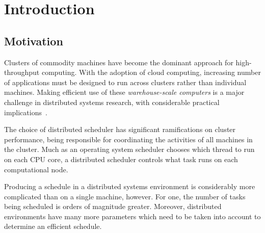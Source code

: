 \chapter{Introduction} \label{chap:intro}

\section{Motivation} \label{sec:intro-motivation}
Clusters of commodity machines have become the dominant approach for high-throughput computing. With the adoption of cloud computing, increasing number of applications must be designed to run across clusters rather than individual machines. Making efficient use of these \emph{warehouse-scale computers} is a major challenge in distributed systems research, with considerable practical implications~\cite{WarehouseScale:2009}.

The choice of distributed scheduler has significant ramifications on cluster performance, being responsible for coordinating the activities of all machines in the cluster. Much as an operating system scheduler chooses which thread to run on each CPU core, a distributed scheduler controls what task runs on each computational node.

Producing a schedule in a distributed systems environment is considerably more complicated than on a single machine, however. For one, the number of tasks being scheduled is orders of magnitude greater. Moreover, distributed environments have many more parameters which need to be taken into account to determine an efficient schedule.




